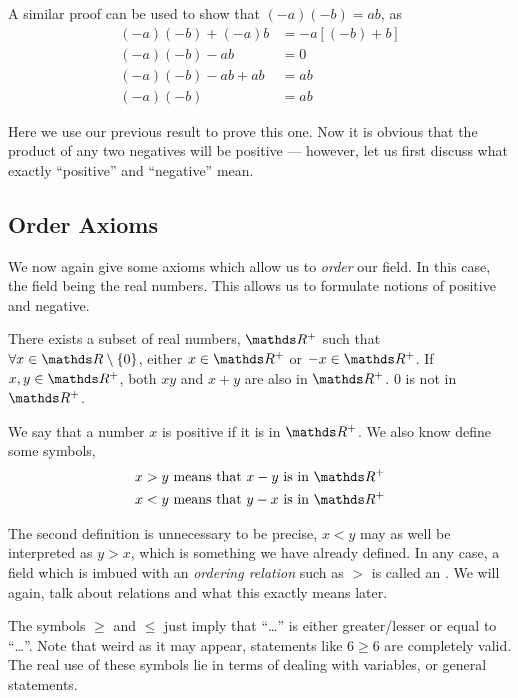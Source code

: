 A similar proof can be used to show that \((-a)(-b) = ab\), as 
\begin{align*}
    (-a)(-b) + (-a)b &= -a[(-b) + b] \\
    (-a)(-b) - ab &= 0\\
    (-a)(-b) - ab + ab &= ab\\
    (-a)(-b) &= ab
\end{align*}

Here we use our previous result to prove this one. Now it is obvious that the product of 
any two negatives will be positive --- however, let us first discuss what exactly ``positive''
and ``negative'' mean.

\subsection{Order Axioms}

We now again give some axioms which allow us to \emph{order} our field. 
In this case, the field being the real numbers. This allows us to formulate notions 
of positive and negative. 

\begin{axioms}
    \ii There exists a subset of real numbers, \(\RR^+\) such that \(\forall x \in \RR \setminus \Set{0}\),
     either \(x \in \RR^+\) or \(-x \in \RR^+\).
    \ii If \(x, y \in \RR^+\), both \(xy\) and \(x + y\) are also in \(\RR^+\).
    \ii \(0\) is not in \(\RR^+\).
\end{axioms}

We say that a number \(x\) is positive if it is in \(\RR^+\). We also know define some symbols, 
\begin{align*}
    x > y \text{ means that } x - y \text{ is in } \RR^+ \\
    x < y \text{ means that } y - x \text{ is in } \RR^+ 
\end{align*}

The second definition is unnecessary to be precise, \(x < y\) may as well be 
interpreted as \(y > x\), which is something we have already defined. In any case, 
a field which is imbued with an \emph{ordering relation} such as \(>\) is called 
an . We will again, talk about relations and what this exactly 
means later.

The symbols \(\ge\) and \(\le\) just imply that ``\dots'' is either greater/lesser or equal to ``\dots''.
Note that weird as it may appear, statements like \(6 \ge 6\) are completely valid. 
The real use of these symbols lie in terms of dealing with variables, or general 
statements.

